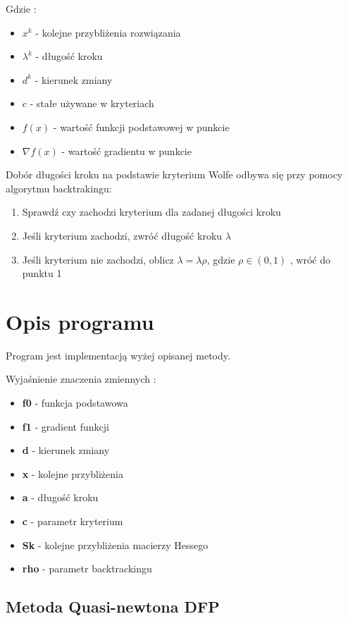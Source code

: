 \documentclass{classrep}
\begin{document}
Gdzie :
\begin{itemize}
 \item $x^k$ - kolejne przybliżenia rozwiązania
 \item $\lambda ^k$ - długość kroku
 \item $d ^k$ - kierunek zmiany
 \item $c$ - stałe używane w kryteriach
 \item $f(x)$ - wartość funkcji podstawowej w punkcie
 \item $\nabla f(x)$ - wartość gradientu w punkcie
\end{itemize}


Dobór długości kroku na podstawie kryterium Wolfe odbywa się przy pomocy algorytmu backtrakingu:
\begin{enumerate}
\item Sprawdź czy zachodzi kryterium dla zadanej długości kroku
\item Jeśli kryterium zachodzi, zwróć długość kroku $\lambda$
\item Jeśli kryterium nie zachodzi, oblicz $\lambda =\lambda \rho$, gdzie $\rho \in (0,1)$ , wróć do punktu 1
\end{enumerate}



\section{Opis programu}
Program jest implementacją wyżej opisanej metody. 

Wyjaśnienie znaczenia zmiennych :
\begin{itemize}
\item \textbf{f0} - funkcja podstawowa
\item \textbf{f1} - gradient funkcji
\item \textbf{d} - kierunek zmiany
\item \textbf{x} - kolejne przybliżenia
\item \textbf{a} - długość kroku
\item \textbf{c} - parametr kryterium
\item \textbf{Sk} - kolejne przybliżenia macierzy Hessego
\item \textbf{rho} - parametr backtrackingu
\end{itemize}
\subsection{Metoda Quasi-newtona DFP}
\end{document}
